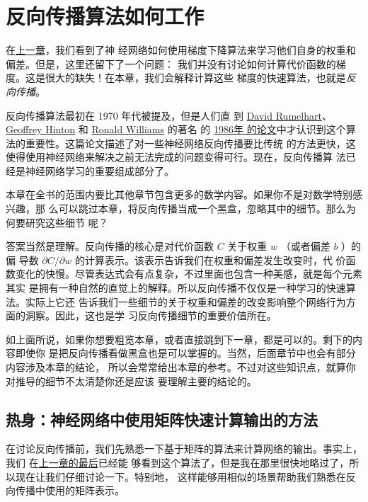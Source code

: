 
\chapter{反向传播算法如何工作}
\label{ch:HowTheBackpropagationAlgorithmWorks}

在\hyperref[ch:UsingNeuralNetsToRecognizeHandwrittenDigits]{上一章}，我们看到了神
经网络如何使用梯度下降算法来学习他们自身的权重和偏差。但是，这里还留下了一个问题：
我们并没有讨论如何计算代价函数的梯度。这是很大的缺失！在本章，我们会解释计算这些
梯度的快速算法，也就是\emph{反向传播}。

反向传播算法最初在 1970 年代被提及，但是人们直
到 \href{http://en.wikipedia.org/wiki/David_Rumelhart}{David
  Rumelhart}、 \href{http://www.cs.toronto.edu/~hinton/}{Geoffrey
  Hinton} 和 \href{http://en.wikipedia.org/wiki/Ronald_J._Williams}{Ronald
  Williams} 的著名
的 \href{http://www.nature.com/nature/journal/v323/n6088/pdf/323533a0.pdf}{1986年
  的论文}中才认识到这个算法的重要性。这篇论文描述了对一些神经网络反向传播要比传统
的方法更快，这使得使用神经网络来解决之前无法完成的问题变得可行。现在，反向传播算
法已经是神经网络学习的重要组成部分了。

本章在全书的范围内要比其他章节包含更多的数学内容。如果你不是对数学特别感兴趣，那
么可以跳过本章，将反向传播当成一个黑盒，忽略其中的细节。那么为何要研究这些细节
呢？

答案当然是理解。反向传播的核心是对代价函数 $C$ 关于权重 $w$ （或者偏差 $b$ ）的偏
导数 $\partial C/\partial w$ 的计算表示。该表示告诉我们在权重和偏差发生改变时，代
价函数变化的快慢。尽管表达式会有点复杂，不过里面也包含一种美感，就是每个元素其实
是拥有一种自然的直觉上的解释。所以反向传播不仅仅是一种学习的快速算法。实际上它还
告诉我们一些细节的关于权重和偏差的改变影响整个网络行为方面的洞察。因此，这也是学
习反向传播细节的重要价值所在。

如上面所说，如果你想要粗览本章，或者直接跳到下一章，都是可以的。剩下的内容即使你
是把反向传播看做黑盒也是可以掌握的。当然，后面章节中也会有部分内容涉及本章的结论，
所以会常常给出本章的参考。不过对这些知识点，就算你对推导的细节不太清楚你还是应该
要理解主要的结论的。

\section{热身：神经网络中使用矩阵快速计算输出的方法}
\label{sec:warm_up}

在讨论反向传播前，我们先熟悉一下基于矩阵的算法来计算网络的输出。事实上，我们
在\hyperref[sec:implementing_our_network_to_classify_digits]{上一章的最后}已经能
够看到这个算法了，但是我在那里很快地略过了，所以现在让我们仔细讨论一下。特别地，
这样能够用相似的场景帮助我们熟悉在反向传播中使用的矩阵表示。


